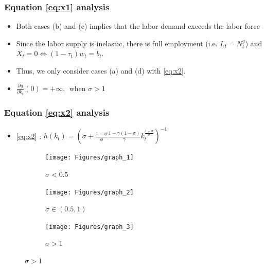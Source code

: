 \documentclass{beamer}
\begin{document}
		\begin{frame}\frametitle{Equation \eqref{eq:x1} analysis}
			\begin{itemize}
				\item Both cases (b) and (c) implies that the labor demand exceeds the labor force
				\item Since the labor supply is inelastic, there is full employment (i.e. $L_t = N_t^y$) and $X_t = 0 \Leftrightarrow (1-\tau_t)w_t = b_t$.
				\vspace{1em}
				\item Thus, we only consider cases (a) and (d) with \eqref{eq:x2}.
				\item $\frac{\partial g}{\partial k_t}(0) = +\infty,~~\text{when }\sigma > 1$
			\end{itemize}
			\hyperlink{captolab<1>}{}
		\end{frame}
		\begin{frame}\frametitle{Equation \eqref{eq:x2} analysis}
			\begin{itemize}
				\item \eqref{eq:x2} : $ h(k_t) = \left( \sigma + \frac{1-\phi}{\phi} \frac{1-\gamma(1-\sigma)}{\gamma} k_t^{\frac{1-\sigma}{\sigma}} \right)^{-1}$
			\end{itemize}
			\begin{figure}[ht] 
				\begin{subfigure}[t]{0.32\linewidth}
					\centering
					\texttt{[image: Figures/graph\_1]} 
					\caption{$ \sigma < 0.5$} 
					\label{fig:graph_1} 
					\vspace{4ex}
				\end{subfigure}
				\begin{subfigure}[t]{0.32\linewidth}
					\centering
					\texttt{[image: Figures/graph\_2]} 
					\caption{$ \sigma \in (0.5, 1)$} 
					\label{fig:graph_2} 
				\end{subfigure}
				\begin{subfigure}[t]{0.32\linewidth}
					\centering
					\texttt{[image: Figures/graph\_3]} 
					\caption{$\sigma>1$} 
					\label{fig:graph_3} 
				\end{subfigure}
			\end{figure}
			\hyperlink{captolab<1>}{}
		\end{frame}
\end{document}
